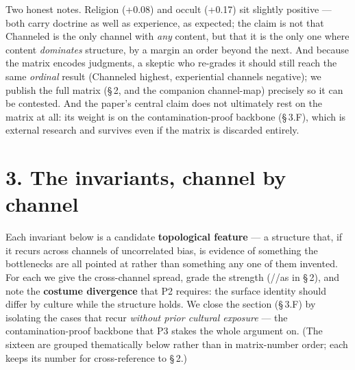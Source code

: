\documentclass[11pt]{article}
\begin{document}
Two honest notes. Religion (+0.08) and occult (+0.17) sit slightly positive --- both carry doctrine as well as experience, as expected; the claim is not that Channeled is the only channel with \emph{any} content, but that it is the only one where content \emph{dominates} structure, by a margin an order beyond the next. And because the matrix encodes judgments, a skeptic who re-grades it should still reach the same \emph{ordinal} result (Channeled highest, experiential channels negative); we publish the full matrix (\S\,2, and the companion channel-map) precisely so it can be contested. And the paper's central claim does not ultimately rest on the matrix at all: its weight is on the contamination-proof backbone (\S\,3.F), which is external research and survives even if the matrix is discarded entirely.

\section*{3. The invariants, channel by channel}
Each invariant below is a candidate \textbf{topological feature} --- a structure that, if it recurs across channels of uncorrelated bias, is evidence of something the bottlenecks are all pointed at rather than something any one of them invented. For each we give the cross-channel spread, grade the strength (\CIRCLE/\LEFTcircle/\Circle as in \S\,2), and note the \textbf{costume divergence} that P2 requires: the surface identity should differ by culture while the structure holds. We close the section (\S\,3.F) by isolating the cases that recur \emph{without prior cultural exposure} --- the contamination-proof backbone that P3 stakes the whole argument on. (The sixteen are grouped thematically below rather than in matrix-number order; each keeps its number for cross-reference to \S\,2.)
\end{document}
